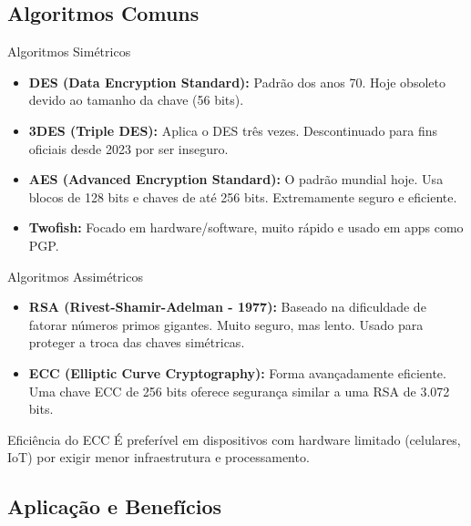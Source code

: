 \documentclass[aspectratio=169]{beamer}
\begin{document}
\subsection{Algoritmos Comuns}

\begin{frame}{Algoritmos Simétricos}
    \begin{itemize}
        \item \textbf{DES (Data Encryption Standard):} Padrão dos anos 70. Hoje obsoleto devido ao tamanho da chave (56 bits).
        \item \textbf{3DES (Triple DES):} Aplica o DES três vezes. Descontinuado para fins oficiais desde 2023 por ser inseguro.
        \item \textbf{AES (Advanced Encryption Standard):} O padrão mundial hoje. Usa blocos de 128 bits e chaves de até 256 bits. Extremamente seguro e eficiente.
        \item \textbf{Twofish:} Focado em hardware/software, muito rápido e usado em apps como PGP.
    \end{itemize}
\end{frame}

\begin{frame}{Algoritmos Assimétricos}
    \begin{itemize}
        \item \textbf{RSA (Rivest-Shamir-Adelman - 1977):} Baseado na dificuldade de fatorar números primos gigantes. Muito seguro, mas lento. Usado para proteger a troca das chaves simétricas.
        \item \textbf{ECC (Elliptic Curve Cryptography):} Forma avançadamente eficiente. Uma chave ECC de 256 bits oferece segurança similar a uma RSA de 3.072 bits.
    \end{itemize}
    \begin{exampleblock}{Eficiência do ECC}
        É preferível em dispositivos com hardware limitado (celulares, IoT) por exigir menor infraestrutura e processamento.
    \end{exampleblock}
\end{frame}

\subsection{Aplicação e Benefícios}
\end{document}
